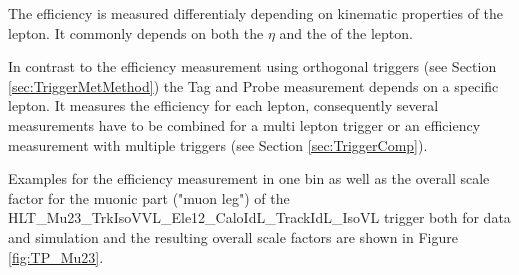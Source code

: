 The efficiency is measured differentialy depending on kinematic properties of the lepton. It commonly depends on both the $\eta$ and the \pt of the lepton. 

In contrast to the efficiency measurement using orthogonal triggers (see Section \ref{sec:TriggerMetMethod}) the Tag and Probe measurement depends on a specific lepton. It measures the efficiency for each lepton, consequently several measurements have to be combined for a multi lepton trigger or an efficiency measurement with multiple triggers (see Section \ref{sec:TriggerComp}). 

Examples for the efficiency measurement in one bin as well as the overall scale factor for the muonic part ("muon leg") of the\\ HLT\_Mu23\_TrkIsoVVL\_Ele12\_CaloIdL\_TrackIdL\_IsoVL trigger both for data and simulation and the resulting overall scale factors are shown in Figure \ref{fig:TP_Mu23}.

